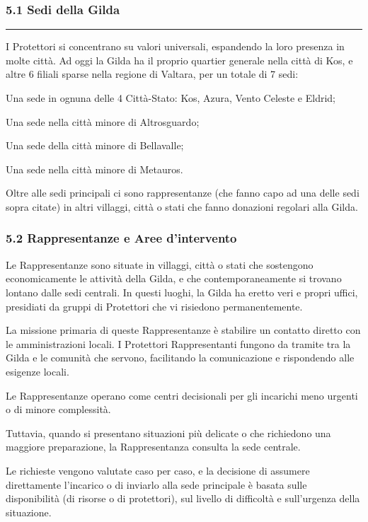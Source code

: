 \subsubsection{5.1 Sedi della Gilda}\label{sedi-della-gilda}

\begin{center}\rule{0.5\linewidth}{0.5pt}\end{center}

I Protettori si concentrano su valori universali, espandendo la loro
presenza in molte città. Ad oggi la Gilda ha il proprio quartier
generale nella città di Kos, e altre 6 filiali sparse nella regione di
Valtara, per un totale di 7 sedi:

Una sede in ognuna delle 4 Città-Stato: Kos, Azura, Vento Celeste e
Eldrid;

Una sede nella città minore di Altrosguardo;

Una sede della città minore di Bellavalle;

Una sede nella città minore di Metauros.

Oltre alle sedi principali ci sono rappresentanze (che fanno capo ad una
delle sedi sopra citate) in altri villaggi, città o stati che fanno
donazioni regolari alla Gilda.

\subsubsection{5.2 Rappresentanze e Aree
d'intervento}\label{rappresentanze-e-aree-dintervento}

Le Rappresentanze sono situate in villaggi, città o stati che sostengono
economicamente le attività della Gilda, e che contemporaneamente si
trovano lontano dalle sedi centrali. In questi luoghi, la Gilda ha
eretto veri e propri uffici, presidiati da gruppi di Protettori che vi
risiedono permanentemente.

La missione primaria di queste Rappresentanze è stabilire un contatto
diretto con le amministrazioni locali. I Protettori Rappresentanti
fungono da tramite tra la Gilda e le comunità che servono, facilitando
la comunicazione e rispondendo alle esigenze locali.

Le Rappresentanze operano come centri decisionali per gli incarichi meno
urgenti o di minore complessità.

Tuttavia, quando si presentano situazioni più delicate o che richiedono
una maggiore preparazione, la Rappresentanza consulta la sede centrale.

Le richieste vengono valutate caso per caso, e la decisione di assumere
direttamente l'incarico o di inviarlo alla sede principale è basata
sulle disponibilità (di risorse o di protettori), sul livello di
difficoltà e sull'urgenza della situazione.

